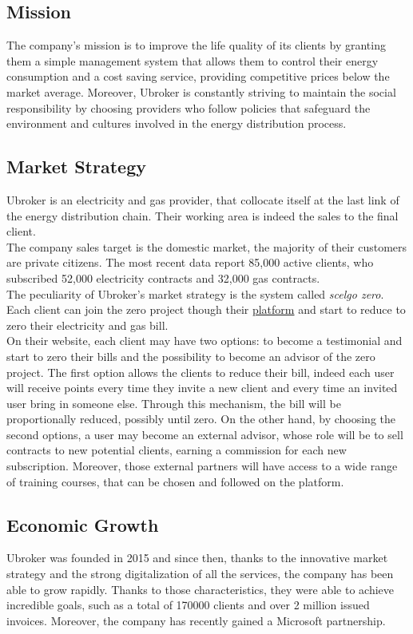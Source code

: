 \documentclass[12pt, a4paper, oneside]{article}
\begin{document}
\subsection{Mission}
The company's mission is to improve the life quality of its clients by granting them a simple management system that allows them to control their energy consumption and a cost saving service, providing 
competitive prices below the market average. Moreover, Ubroker is constantly striving to maintain the social responsibility by choosing providers who follow policies that safeguard the environment and cultures
involved in the energy distribution process.

\subsection{Market Strategy}
Ubroker is an electricity and gas provider, that collocate itself at the last link of the energy distribution chain. Their working area is indeed the sales to the final client.\\
The company sales target is the domestic market, the majority of their customers are private citizens. The most recent data report 85,000 active clients, who subscribed 52,000 electricity contracts
and 32,000 gas contracts.\\
The peculiarity of Ubroker's market strategy is the system called \emph{scelgo zero}. Each client can join the zero project though their \href{https://scelgozero.it/}{platform} and start to reduce to zero their
electricity and gas bill.\\
On their website, each client may have two options: to become a testimonial and start to zero their bills and the possibility to become an advisor of the zero project. The first option allows the clients to reduce their bill, indeed each user will receive points
every time they invite a new client and every time an invited user bring in someone else. Through this mechanism, the bill will be proportionally reduced, possibly until zero.
On the other hand, by choosing the second options, a user may become an external advisor, whose role will be to sell contracts to new potential clients, earning a commission for each new subscription. 
Moreover, those external partners will have access to a wide range of training courses, that can be chosen and followed on the platform.

\newpage
\subsection{Economic Growth}
Ubroker was founded in 2015 and since then, thanks to the innovative market strategy and the strong digitalization of all the services, the company has been able to grow rapidly. Thanks to those characteristics,
they were able to achieve incredible goals, such as a total of 170000 clients and over 2 million issued invoices. Moreover, the company has recently gained a Microsoft partnership.
\end{document}
